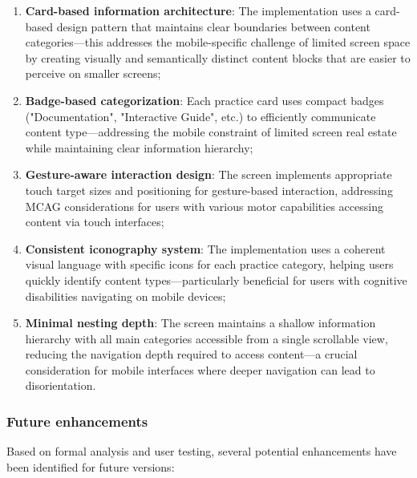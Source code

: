 \begin{enumerate}
    \item \textbf{Card-based information architecture}: The implementation uses a card-based design pattern that maintains clear boundaries between content categories—this addresses the mobile-specific challenge of limited screen space by creating visually and semantically distinct content blocks that are easier to perceive on smaller screens;
    
    \item \textbf{Badge-based categorization}: Each practice card uses compact badges ("Documentation", "Interactive Guide", etc.) to efficiently communicate content type—addressing the mobile constraint of limited screen real estate while maintaining clear information hierarchy;
    
    \item \textbf{Gesture-aware interaction design}: The screen implements appropriate touch target sizes and positioning for gesture-based interaction, addressing MCAG considerations for users with various motor capabilities accessing content via touch interfaces;
    
    \item \textbf{Consistent iconography system}: The implementation uses a coherent visual language with specific icons for each practice category, helping users quickly identify content types—particularly beneficial for users with cognitive disabilities navigating on mobile devices;
    
    \item \textbf{Minimal nesting depth}: The screen maintains a shallow information hierarchy with all main categories accessible from a single scrollable view, reducing the navigation depth required to access content—a crucial consideration for mobile interfaces where deeper navigation can lead to disorientation.
\end{enumerate}

\subsubsection{Future enhancements}

Based on formal analysis and user testing, several potential enhancements have been identified for future versions:

